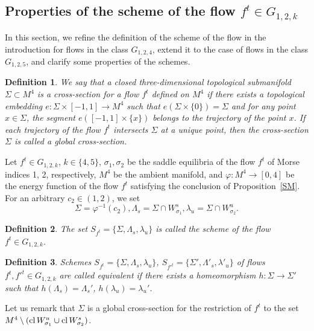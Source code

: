 \documentclass[%
 aip,
 amsmath,amssymb,
preprint,%
]{revtex4-1}
\newtheorem{definition}{Definition}
\begin{document}
\subsection{Properties of the  scheme of the flow  $f^t\in G_{1,2,k}$}

In this section, we refine the definition of the scheme of the  flow in the introduction for flows in the class $G_{1,2,4}$, extend it to the case of flows in the class $G_{1,2,5}$, and clarify some properties of the schemes. 


\begin{definition}\label{seq}
We say that a closed three-dimensional topological submanifold $\Sigma\subset M^4$ is a cross-section for a flow $f^t$ defined on $M^4$ if there exists a topological embedding $e: \Sigma\times [-1,1]\to M^4$ such that $e(\Sigma\times \{0\})=\Sigma$
and for any point $x\in \Sigma$, the segment $e([-1,1]\times \{x\})$ belongs to the trajectory of the point $x$. If each trajectory of the flow $f^t$ intersects $\Sigma$ at a unique point, then the cross-section  $\Sigma$ is called a global cross-section.
\end{definition}

Let $f^t\in G_{1,2,k}$, $k\in \{4,5\}$, $\sigma_1, \sigma_2$ be the saddle equilibria of the flow $f^t$ of Morse indices 1, 2, respectively, $M^4$ be the ambient manifold, and $\varphi: M^4\to [0,4]$ be the energy function of the flow $f^t$ satisfying the conclusion of Proposition~\ref{SM}. For an arbitrary $c_2\in (1,2)$, we set $$ \Sigma=\varphi^{-1}(c_2), \Lambda_s=\Sigma\cap W^s_{\sigma_1}, \lambda_u=\Sigma\cap W^u_{\sigma_2}.$$

\begin{definition}\label{sh-exdef} The set $S_{f^t}=\{\Sigma, \Lambda_s, \lambda_u\}$ %
is called the scheme of the flow  $f^t\in G_{1,2,k}$.
\end{definition} 

\begin{definition}\label{sh-eq} Schemes $S_{f^t}=\{\Sigma, \Lambda_s, \lambda_u\}$, $S_{{f'}^t}=\{\Sigma', \Lambda'_s, \lambda'_u\}$ of  flows $f^t, {f'}^t\in G_{1,2,k}$ are called equivalent if there exists  a homeomorphism $h: \Sigma\to \Sigma'$ such that $h(\Lambda_s)=\Lambda_s'$, $h(\lambda_u)=\lambda_u'$. 
\end{definition}

Let us remark that  $\Sigma$ is a global cross-section for the restriction of $f^t$ to the set $M^4\setminus ({\rm cl}\, W^u_{\sigma_1}\cup {\rm cl}\, W^s_{\sigma_2})$.
\end{document}

